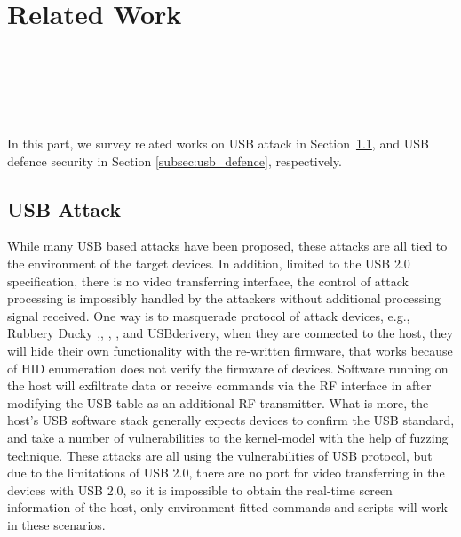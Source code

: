 \section{Related Work}
\label{sec:related_work}
\\
\\
\\
\\
\\

In this part, we survey related works on USB attack in Section~\ref{subsec:usb_attack}, and USB defence security in Section \ref{subsec:usb_defence}, respectively.

\subsection{USB Attack}
\label{subsec:usb_attack}
While many USB based attacks have been proposed, these attacks are all tied to the environment of the target devices. In addition, limited to the USB 2.0\cite{usb20} specification, there is no video transferring interface, the control of attack processing is impossibly handled by the attackers without additional processing signal received. One way is to masquerade protocol of attack devices, e.g., Rubbery Ducky \cite{rubber},\cite{badusb}, \cite{rubberducky2020}, \cite{usbbypassing}, \cite{iseeyou}and USBderivery\cite{usbdriver}, when they are connected to the host, they will hide their own functionality with the re-written firmware, that works because of HID enumeration does not verify the firmware of devices. Software running on the host will exfiltrate data or receive commands via the RF interface in \cite{turnip} after modifying the USB table as an additional RF transmitter. What is more, the host's USB software stack generally expects devices to confirm the USB standard, \cite{facedancer} and \cite{syzkaller} take a number of vulnerabilities to the kernel-model with the help of fuzzing technique. These attacks are all using the vulnerabilities of USB protocol, but due to the limitations of USB 2.0, there are no port for video transferring in the devices with USB 2.0, so it is impossible to obtain the real-time screen information of the host, only environment fitted commands and scripts will work in these scenarios.

